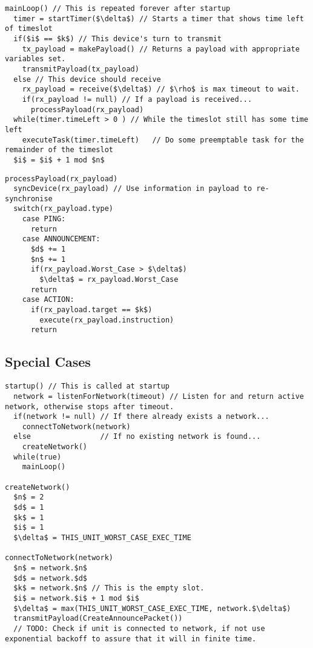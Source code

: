 \begin{lstlisting}[style=customc,mathescape=true,caption={Pseudocode example of the main loop}]  
mainLoop() // This is repeated forever after startup
  timer = startTimer($\delta$) // Starts a timer that shows time left of timeslot
  if($i$ == $k$) // This device's turn to transmit
  	tx_payload = makePayload() // Returns a payload with appropriate variables set.
  	transmitPayload(tx_payload)
  else // This device should receive
  	rx_payload = receive($\delta$) // $\rho$ is max timeout to wait. 
  	if(rx_payload != null) // If a payload is received...
  	  processPayload(rx_payload)
  while(timer.timeLeft > 0 ) // While the timeslot still has some time left
    executeTask(timer.timeLeft)   // Do some preemptable task for the remainder of the timeslot
  $i$ = $i$ + 1 mod $n$   
\end{lstlisting}  

\begin{lstlisting}[style=customc,mathescape=true,caption={Pseudocode example of the method that processes the payload}]  
processPayload(rx_payload)
  syncDevice(rx_payload) // Use information in payload to re-synchronise
  switch(rx_payload.type)
    case PING:
      return
    case ANNOUNCEMENT:
      $d$ += 1
      $n$ += 1
      if(rx_payload.Worst_Case > $\delta$)
        $\delta$ = rx_payload.Worst_Case
      return
    case ACTION:
      if(rx_payload.target == $k$)
        execute(rx_payload.instruction)
      return         
\end{lstlisting}

\subsection{Special Cases} %
\label{sub:special_cases} 


\begin{lstlisting}[style=customc,mathescape=true,caption={Pseudocode example of special case functions}]
startup() // This is called at startup                                           
  network = listenForNetwork(timeout) // Listen for and return active network, otherwise stops after timeout.
  if(network != null) // If there already exists a network...
    connectToNetwork(network)
  else                // If no existing network is found...
    createNetwork()
  while(true)
    mainLoop()
  
createNetwork()
  $n$ = 2
  $d$ = 1
  $k$ = 1
  $i$ = 1
  $\delta$ = THIS_UNIT_WORST_CASE_EXEC_TIME
  
connectToNetwork(network)
  $n$ = network.$n$
  $d$ = network.$d$
  $k$ = network.$n$ // This is the empty slot.
  $i$ = network.$i$ + 1 mod $i$
  $\delta$ = max(THIS_UNIT_WORST_CASE_EXEC_TIME, network.$\delta$)
  transmitPayload(CreateAnnouncePacket())
  // TODO: Check if unit is connected to network, if not use exponential backoff to assure that it will in finite time.
\end{lstlisting}   
